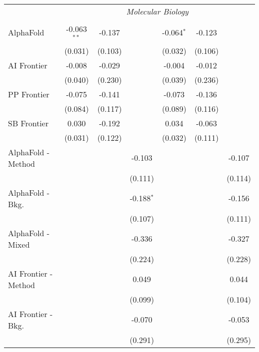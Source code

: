 \begin{tabular}{lcccccc}
 & \multicolumn{6}{c}{\textit{Molecular Biology}} \\ \\
   AlphaFold            & -0.063$^{**}$ & -0.137  &              & -0.064$^{*}$ & -0.123  &   \\   
                        & (0.031)       & (0.103) &              & (0.032)      & (0.106) &   \\   
   AI Frontier          & -0.008        & -0.029  &              & -0.004       & -0.012  &   \\   
                        & (0.040)       & (0.230) &              & (0.039)      & (0.236) &   \\   
   PP Frontier          & -0.075        & -0.141  &              & -0.073       & -0.136  &   \\   
                        & (0.084)       & (0.117) &              & (0.089)      & (0.116) &   \\   
   SB Frontier          & 0.030         & -0.192  &              & 0.034        & -0.063  &   \\   
                        & (0.031)       & (0.122) &              & (0.032)      & (0.111) &   \\   
   AlphaFold - Method   &               &         & -0.103       &              &         & -0.107\\   
                        &               &         & (0.111)      &              &         & (0.114)\\   
   AlphaFold - Bkg.     &               &         & -0.188$^{*}$ &              &         & -0.156\\   
                        &               &         & (0.107)      &              &         & (0.111)\\   
   AlphaFold - Mixed    &               &         & -0.336       &              &         & -0.327\\   
                        &               &         & (0.224)      &              &         & (0.228)\\   
   AI Frontier - Method &               &         & 0.049        &              &         & 0.044\\   
                        &               &         & (0.099)      &              &         & (0.104)\\   
   AI Frontier - Bkg.   &               &         & -0.070       &              &         & -0.053\\   
                        &               &         & (0.291)      &              &         & (0.295)\\   

\end{tabular}
